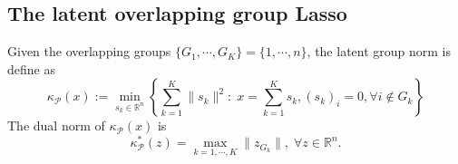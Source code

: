 \documentclass{article}
\numberwithin{equation}{section}
\begin{document}



\subsection{The latent overlapping group Lasso}

Given the overlapping groups $ \{G_1, \cdots, G_K\}=\{1, \cdots, n\} $, the latent group norm \cite[Example~16]{sun2022screening} is define as 
\begin{equation*}
	\kappa_{\mathcal{P}}(x):=\min_{s_k\in \mathbb{R}^n}\left\{\sum_{k=1}^K\|s_k\|^2:\; x = \sum_{k=1}^{K} s_k, (s_k)_i=0, \forall i\notin G_k \right\}
\end{equation*}
The dual norm of $ \kappa_{\mathcal{P}}(x) $  \cite[Lemma~3]{obozinski2011group} is 
\begin{equation*}
	\kappa^*_{\mathcal{P}}(z) = \max\limits_{k=1,\cdots, K}\|z_{G_k}\|,\; \forall z\in\mathbb{R}^n.
\end{equation*}

\end{document}
